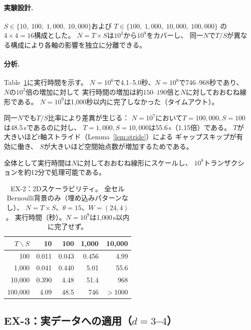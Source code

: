 \paragraph{実験設計.}
$S \in \{10,\; 100,\; 1{,}000,\; 10{,}000\}$および
$T \in \{100,\; 1{,}000,\; 10{,}000,\; 100{,}000\}$
の$4 \times 4 = 16$構成とした。
$N = T \times S$は$10^3$から$10^9$をカバーし、
同一$N$で$T/S$が異なる構成により各軸の影響を独立に分離できる。

\paragraph{分析.}
Table~\ref{tab:ex2_grid}に実行時間を示す。
$N = 10^6$で4.1--5.0秒、$N = 10^8$で746--968秒であり、
$N$の$10^2$倍の増加に対して
実行時間の増加は約$150$--$190$倍と$N$に対しておおむね線形である。
$N = 10^9$は1{,}000秒以内に完了しなかった（タイムアウト）。

同一$N$でも$T/S$比率により差異が生じる：
$N = 10^7$において$T{=}100{,}000, S{=}100$は48.5\,sであるのに対し、
$T{=}1{,}000, S{=}10{,}000$は55.6\,s（1.15倍）である。
$T$が大きいほど$t$軸ストライド（Lemma~\ref{lem:stride}）による
ギャップスキップが有効に働き、
$S$が大きいほど空間始点数が増加するためである。

全体として実行時間は$N$に対しておおむね線形にスケールし、
$10^8$トランザクションを約12分で処理可能である。

\begin{table}[t]
\centering
\caption{EX-2：2Dスケーラビリティ。
  全セルBernoulli背景のみ（埋め込みパターンなし）、
  $N = T \times S$、$\theta = 15$、$W = (24, 4)$。
  実行時間（秒）。$N = 10^9$は1{,}000\,s以内に完了せず。}
\label{tab:ex2_grid}
\small
\begin{tabular}{r|rrrr}
\toprule
$T \backslash S$ & 10 & 100 & 1{,}000 & 10{,}000 \\
\midrule
      100 & 0.011 &  0.043 &  0.456 &  4.99 \\
  1{,}000 &  0.041 &  0.440 &  5.01 &  55.6 \\
 10{,}000 &  0.390 &  4.48 &  51.4 &  968 \\
100{,}000 &  4.09 &  48.5 &  746 &     $>$1000 \\
\bottomrule
\end{tabular}
\end{table}

\subsection{EX-3：実データへの適用（$d{=}3$--$4$）}
\label{sec:ex3}

